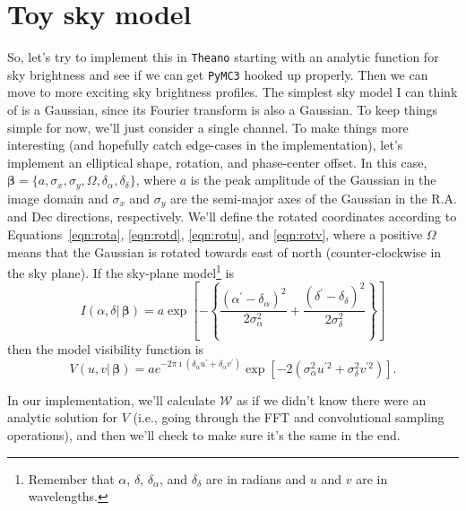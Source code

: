 \documentclass[modern]{aastex62}
\newcommand{\vm}{\boldsymbol{\mathcal{W}}} %
\newcommand{\bbeta}{\boldsymbol{\beta}} %
\begin{document}
\section{Toy sky model}
So, let's try to implement this in \texttt{Theano} starting with an analytic function for sky brightness and see if we can get \texttt{PyMC3} hooked up properly. Then we can move to more exciting sky brightness profiles. The simplest sky model I can think of is a Gaussian, since its Fourier transform is also a Gaussian. To keep things simple for now, we'll just consider a single channel. To make things more interesting (and hopefully catch edge-cases in the implementation), let's implement an elliptical shape, rotation, and phase-center offset. In this case, $\bbeta = \{a, \sigma_x, \sigma_y, \Omega, \delta_\alpha, \delta_\delta \}$, where $a$ is the peak amplitude of the Gaussian in the image domain and $\sigma_x$ and $\sigma_y$ are the semi-major axes of the Gaussian in the R.A. and Dec directions, respectively. We'll define the rotated coordinates according to Equations~\ref{eqn:rota}, \ref{eqn:rotd}, \ref{eqn:rotu}, and \ref{eqn:rotv}, where a positive $\Omega$ means that the Gaussian is rotated towards east of north (counter-clockwise in the sky plane). If the sky-plane model\footnote{Remember that $\alpha$, $\delta$, $\delta_\alpha$, and $\delta_\delta$ are in radians and $u$ and $v$ are in wavelengths.} is
\begin{equation}
    I(\alpha, \delta |\, \bbeta) = a \exp \left [ - \left \{  \frac{(\alpha^\prime - \delta_\alpha)^2}{2 \sigma_\alpha^2} + \frac{(\delta^\prime - \delta_\delta)^2}{2 \sigma_\delta^2} \right \} \right ]
\end{equation}
then the model visibility function is
\begin{equation}
    V(u, v |\, \bbeta) = a e^{- 2 \pi \imath (\delta_\alpha u^\prime + \delta_\alpha v^\prime)} \exp \left [ -2 (\sigma_\alpha^2 u^{\prime 2} + \sigma_\delta^2 v^{\prime 2}) \right ].
\end{equation}

In our implementation, we'll calculate $\vm$ as if we didn't know there were an analytic solution for $V$ (i.e., going through the FFT and convolutional sampling operations), and then we'll check to make sure it's the same in the end.

\end{document}
